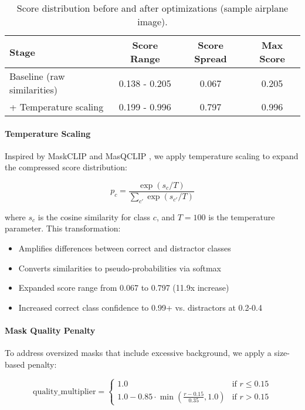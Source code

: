 \begin{table}[h]
\centering
\caption{Score distribution before and after optimizations (sample airplane image).}
\label{tab:score_distribution}
\begin{tabular}{lccc}
\hline
\textbf{Stage} & \textbf{Score Range} & \textbf{Score Spread} & \textbf{Max Score} \\
\hline
Baseline (raw similarities) & 0.138 - 0.205 & 0.067 & 0.205 \\
+ Temperature scaling & 0.199 - 0.996 & 0.797 & 0.996 \\
\hline
\end{tabular}
\end{table}

\paragraph{Temperature Scaling}
Inspired by MaskCLIP and MasQCLIP \cite{zhou2022extract}, we apply temperature scaling to expand the compressed score distribution:

\begin{equation}
p_c = \frac{\exp(s_c / T)}{\sum_{c'} \exp(s_{c'} / T)}
\end{equation}

where $s_c$ is the cosine similarity for class $c$, and $T=100$ is the temperature parameter. This transformation:
\begin{itemize}
    \item Amplifies differences between correct and distractor classes
    \item Converts similarities to pseudo-probabilities via softmax
    \item Expanded score range from 0.067 to 0.797 (11.9x increase)
    \item Increased correct class confidence to 0.99+ vs. distractors at 0.2-0.4
\end{itemize}

\paragraph{Mask Quality Penalty}
To address oversized masks that include excessive background, we apply a size-based penalty:

\begin{equation}
\text{quality\_multiplier} = \begin{cases}
1.0 & \text{if } r \leq 0.15 \\
1.0 - 0.85 \cdot \min\left(\frac{r - 0.15}{0.35}, 1.0\right) & \text{if } r > 0.15
\end{cases}
\end{equation}

